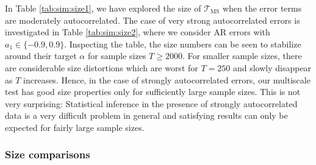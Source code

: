 In Table \ref{tab:sim:size1}, we have explored the size of $\mathcal{T}_{\text{MS}}$ when the error terms are moderately autocorrelated. The case of very strong autocorrelated errors is investigated in Table \ref{tab:sim:size2}, where we consider AR errors with $a_1 \in \{-0.9,0.9\}$. Inspecting the table, the size numbers can be seen to stabilize around their target $\alpha$ for sample sizes $T \ge 2000$. For smaller sample sizes, there are considerable size distortions which are worst for $T=250$ and slowly disappear as $T$ increases. Hence, in the case of strongly autocorrelated errors, our multiscale test has good size properties only for sufficiently large sample sizes. This is not very surprising: Statistical inference in the presence of strongly autocorrelated data is a very difficult problem in general and satisfying results can only be expected for fairly large sample sizes. %


\subsubsection{Size comparisons}


